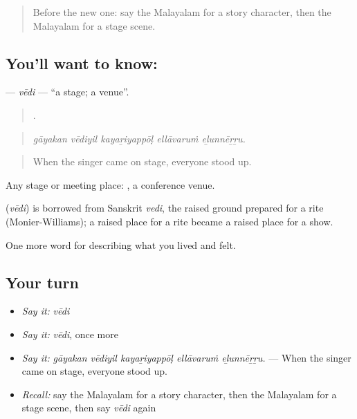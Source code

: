 \label{lesson:ML-C563-vedi}



\begin{quote}
Before the new one: say the Malayalam for a story character, then the Malayalam for a stage scene.
\end{quote}

\subsection*{You'll want to know: }
\textbf{} — \emph{vēdi} — \textquotedblleft{}a stage; a venue\textquotedblright{}.

\begin{quote}
    .
\end{quote}

\begin{quote}
\emph{gāyakan vēdiyil kayaṟiyappōḷ ellāvaruṁ eḻunnēṟṟu.}
\end{quote}

\begin{quote}
When the singer came on stage, everyone stood up.
\end{quote}

Any stage or meeting place:  , a conference venue.

\begin{cousinweb}
\textbf{} (\emph{vēdi}) is borrowed from Sanskrit \emph{vedi}, the raised ground prepared for a rite (Monier-Williams); a raised place for a rite became a raised place for a show.
\end{cousinweb}

\begin{grammarlens}[title={What you've built}]
One more word for describing what you lived and felt.
\end{grammarlens}

\subsection*{Your turn}
\begin{itemize}
\raggedright
  \item \emph{Say it:} \emph{vēdi}
  \item \emph{Say it:} \emph{vēdi}, once more
  \item \emph{Say it:} \emph{gāyakan vēdiyil kayaṟiyappōḷ ellāvaruṁ eḻunnēṟṟu.} — When the singer came on stage, everyone stood up.
  \item \emph{Recall:} say the Malayalam for a story character, then the Malayalam for a stage scene, then say \emph{vēdi} again
\end{itemize}


